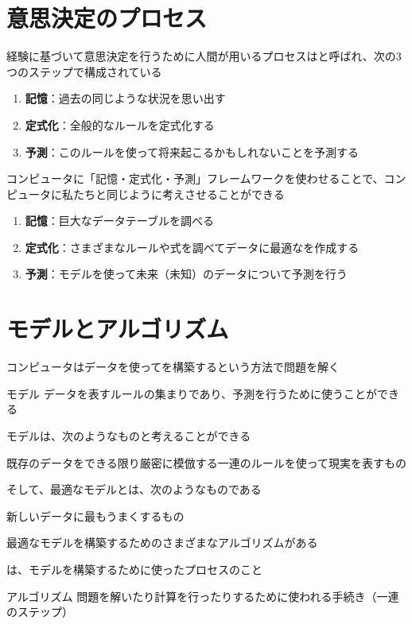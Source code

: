 \documentclass[../../../topic_machine-learning]{subfiles}
\begin{document}
\sectionline
\section{意思決定のプロセス}

経験に基づいて意思決定を行うために人間が用いるプロセスはと呼ばれ、次の3つのステップで構成されている

\begin{enumerate}
  \item \textbf{記憶}：過去の同じような状況を思い出す
  \item \textbf{定式化}：全般的なルールを定式化する
  \item \textbf{予測}：このルールを使って将来起こるかもしれないことを予測する
\end{enumerate}

コンピュータに「記憶・定式化・予測」フレームワークを使わせることで、コンピュータに私たちと同じように考えさせることができる

\begin{enumerate}
  \item \textbf{記憶}：巨大なデータテーブルを調べる
  \item \textbf{定式化}：さまざまなルールや式を調べてデータに最適なを作成する
  \item \textbf{予測}：モデルを使って未来（未知）のデータについて予測を行う
\end{enumerate}

\sectionline
\section{モデルとアルゴリズム}

コンピュータはデータを使ってを構築するという方法で問題を解く

\begin{definition}{モデル}
  データを表すルールの集まりであり、予測を行うために使うことができる
\end{definition}

モデルは、次のようなものと考えることができる
\begin{shaded}
  既存のデータをできる限り厳密に模倣する一連のルールを使って現実を表すもの
\end{shaded}

\br

そして、最適なモデルとは、次のようなものである
\begin{shaded}
  新しいデータに最もうまくするもの
\end{shaded}

\br

最適なモデルを構築するためのさまざまなアルゴリズムがある

は、モデルを構築するために使ったプロセスのこと

\begin{definition}{アルゴリズム}
  問題を解いたり計算を行ったりするために使われる手続き（一連のステップ）
\end{definition}
\end{document}
